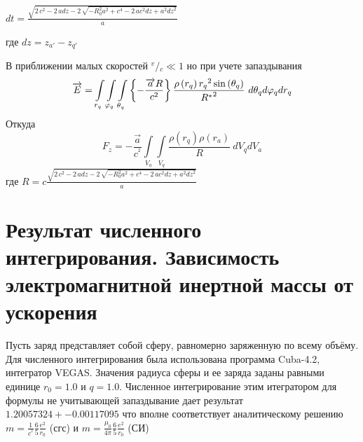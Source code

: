 \documentclass{article}
\begin{document}



$\mathit{dt} = \frac{\sqrt{2 \, c^{2} - 2 \, a \mathit{dz} - 2 \, \sqrt{-R_{0}^{2} a^{2} + c^{4} - 2 \, a c^{2} \mathit{dz} + a^{2} \mathit{dz}^{2}}}}{a}$

где
$\mathit{dz} = z_{a'} - z_{q'}$


В приближении малых скоростей ${}^{v}/{}_{c}\ll 1$ но при учете запаздывания
\[\overrightarrow{E}=\int\limits_{{{r}_{q}}}\int\limits_{{{\varphi}_{q}}}\int\limits_{{{\theta}_{q}}}\\
{\left\{ -\frac{\overrightarrow{a}R}{{{c}^{2}}} \right\}\frac{\rho \left( {{r}_{q}} \right){{r}_{q}}^{2}\sin \left( {{\theta }_{q}} \right)}{{{R}^{*}}^{2}}\ }d{{\theta }_{q}}d{{\varphi }_{q}}d{{r}_{q}}\]
 Откуда
\[{{F}_{z}}=-\frac{\overrightarrow{a}}{{{c}^{^{2}}}}\int\limits_{{{V}_{a}}}{\int\limits_{{{V}_{q}}}{\frac{\rho \left( {{r}_{q}} \right)\rho \left( {{r}_{a}} \right)}{R}}}\ d{{V}_{q}}d{{V}_{a}}\]
где
$\mathit{R} = c\frac{\sqrt{2 \, c^{2} - 2 \, a \mathit{dz} - 2 \, \sqrt{-R_{0}^{2} a^{2} + c^{4} - 2 \, a c^{2} \mathit{dz} + a^{2} \mathit{dz}^{2}}}}{a}$

\section{Результат численного интегрирования. Зависимость электромагнитной инертной массы от ускорения}

Пусть заряд представляет собой сферу, равномерно заряженную по всему объёму.
Для численного интегрирования была использована программа Cuba-4.2, интегратор VEGAS.
Значения радиуса сферы и ее заряда заданы равными единице $r_{0} = 1.0$ и $q = 1.0$.
Численное интегрирование этим итегратором для формулы не учитывающей запаздывание дает результат
$1.20057324 +- 0.00117095$ что вполне соответствует аналитическому решению
$m =\frac{1}{{{c}^{^{2}}}}\frac{6}{5}\frac{e^2}{{{r}_{0}}}$ (сгс) и
$m =\frac{{{\mu }_{0}}}{4\pi }\frac{6}{5}\frac{e^2}{{{r}_{0}}}$ (СИ)
\end{document}
